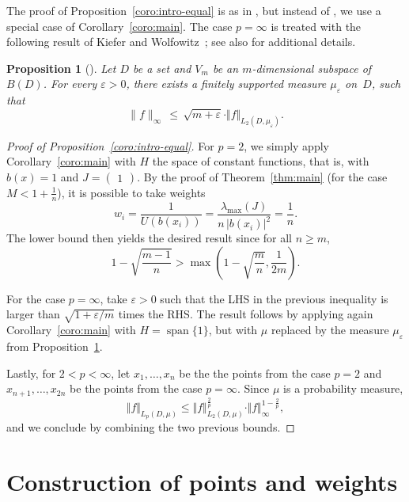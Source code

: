 \documentclass[a4paper,11pt]{article}
\renewcommand{\(}{\left (}
\renewcommand{\)}{\right )}
\newcommand{\<}{\langle}
\renewcommand{\>}{\rangle}
\newcommand{\eps}{\varepsilon}
\newtheorem{prop}[theorem]{Proposition}
\theoremstyle{definition}
\DeclareMathOperator{\Span}{span}
\begin{document}
The proof of Proposition~\ref{coro:intro-equal} is as in \cite[Thm.\,13]{KPUU25-uniform},
but instead of \cite[Thm.\,6.2]{BSU}, we use a special case of Corollary~\ref{coro:main}.
The case $p=\infty$ is treated with 
the following result of Kiefer and Wolfowitz~\cite{KW};
see also \cite[Prop.\,9]{KPUU25-uniform} for additional details.

\begin{prop}[\cite{KW}]\label{prop:KW}
Let $D$ be a set and $V_m$ be an $m$-dimen\-sion\-al subspace of~$B(D)$. 
For every $\varepsilon>0$, 
there exists a finitely supported measure $\mu_\eps$ on~$D$,
such that 
\[
 \|f\|_{\infty} \,\leq\, \sqrt{m+\varepsilon} \cdot \Vert f \Vert_{L_2(D,\mu_\eps)}. 
\]  
\end{prop}

\medskip

\begin{proof}[Proof of Proposition~\ref{coro:intro-equal}]
For $p=2$, we simply apply Corollary~\ref{coro:main} with $H$ the space of constant functions, that is, with $b(x)=1$ and $J=\begin{pmatrix}1\end{pmatrix}$. By the 
proof of Theorem~\ref{thm:main} (for the case $M<1+\frac1n$), it is possible to take weights
\[
w_i=\frac{1}{U(b(x_i))}=\frac{\lambda_{\max}(J)}{n\,|b(x_i)|^2}=\frac{1}{n}.
\]
The lower bound then yields the desired result since for all $n\geq m$,
\[
1-\sqrt{\frac{m-1}{n}}> \max\left(1-\sqrt{\frac{m}{n}},\frac{1}{2m}\right).
\]

For the case $p=\infty$, take $\varepsilon>0$ such that the LHS in the previous inequality is larger than $\sqrt{1+\varepsilon/m}$ times the RHS. The result follows by applying again Corollary~\ref{coro:main} with $H=\Span\{1\}$, but with $\mu$ replaced by the measure $\mu_\varepsilon$ from Proposition~\ref{prop:KW}.

Lastly, for $2<p<\infty$, let $x_1,\hdots,x_n$ be the the points from the case $p=2$
and $x_{n+1},\hdots,x_{2n}$ be the points from the case $p=\infty$.
Since $\mu$ is a probability measure,
\[
\Vert  f \Vert _{L_p(D,\mu)}  \leq 
 \Vert  f  \Vert_{L_2(D,\mu)}^{\frac{2}{p}} \cdot  \Vert  f \Vert_{\infty}^{1-\frac{2}{p}},
\]
and we conclude by combining the two previous bounds.
\end{proof}


\section{Construction of points and weights}
\label{sec:implementation}
\end{document}
